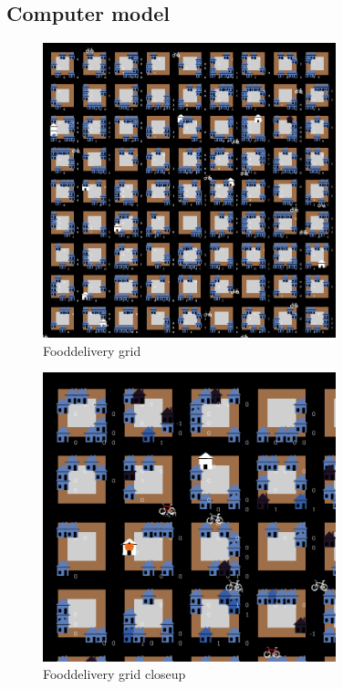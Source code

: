 \subsection{Computer model}\label{subsec:computer-model}

\begin{figure}
    \centering
    \includegraphics[width=8.5cm]{sections/pics/grid}
    \caption{Fooddelivery grid}
    \label{fig:grid}
\end{figure}

\begin{figure}
    \centering
    \includegraphics[width=8.5cm]{sections/pics/grid_closeup}
    \caption{Fooddelivery grid closeup}
    \label{fig:grid closeup}
\end{figure}


